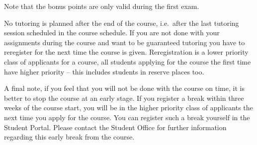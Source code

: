\documentclass[a4paper,logo]{miunart}
\begin{document}
Note that the bonus points are only valid during the first exam.

No tutoring is planned after the end of the course, i.e.\ after the last 
tutoring session scheduled in the course schedule.
If you are not done with your assignments during the course and want to be 
guaranteed tutoring you have to reregister for the next time the course is 
given.
Reregistration is a lower priority class of applicants for a course, all 
students applying for the course the first time have higher priority -- this 
includes students in reserve places too.

A final note, if you feel that you will not be done with the course on time, it 
is better to stop the course at an early stage.
If you register a break within three weeks of the course start, you will be in 
the higher priority class of applicants the next time you apply for the course.
You can register such a break yourself in the Student Portal.
Please contact the Student Office for further information regarding this early 
break from the course.


\printbibliography
\end{document}
